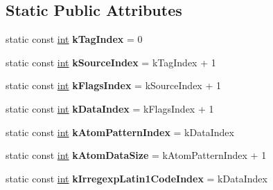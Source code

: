 \subsection*{Static Public Attributes}
\begin{DoxyCompactItemize}
\item 
\mbox{\label{classv8_1_1internal_1_1JSRegExp_a6b776416f183835b0c80536fb03d8c50}} 
static const \mbox{\hyperlink{classint}{int}} {\bfseries k\+Tag\+Index} = 0
\item 
\mbox{\label{classv8_1_1internal_1_1JSRegExp_a8829823bf0846b7e0e35f177a7073965}} 
static const \mbox{\hyperlink{classint}{int}} {\bfseries k\+Source\+Index} = k\+Tag\+Index + 1
\item 
\mbox{\label{classv8_1_1internal_1_1JSRegExp_a516810e52b83b427e6cce8933e9e0572}} 
static const \mbox{\hyperlink{classint}{int}} {\bfseries k\+Flags\+Index} = k\+Source\+Index + 1
\item 
\mbox{\label{classv8_1_1internal_1_1JSRegExp_af16b2b10a9e6f1923103fe6bd46c48de}} 
static const \mbox{\hyperlink{classint}{int}} {\bfseries k\+Data\+Index} = k\+Flags\+Index + 1
\item 
\mbox{\label{classv8_1_1internal_1_1JSRegExp_a67adfd18de6fea50f6e492dfdc4b1b04}} 
static const \mbox{\hyperlink{classint}{int}} {\bfseries k\+Atom\+Pattern\+Index} = k\+Data\+Index
\item 
\mbox{\label{classv8_1_1internal_1_1JSRegExp_ad68a24d05c9c76742bf98370f73ddde8}} 
static const \mbox{\hyperlink{classint}{int}} {\bfseries k\+Atom\+Data\+Size} = k\+Atom\+Pattern\+Index + 1
\item 
\mbox{\label{classv8_1_1internal_1_1JSRegExp_a7d8bb3b9e17479eb8048f9e5d4fc928c}} 
static const \mbox{\hyperlink{classint}{int}} {\bfseries k\+Irregexp\+Latin1\+Code\+Index} = k\+Data\+Index
\item 
\mbox{\label{classv8_1_1internal_1_1JSRegExp_a624664cd30b9dae03165e951d9421831}} 

\end{DoxyCompactItemize}
